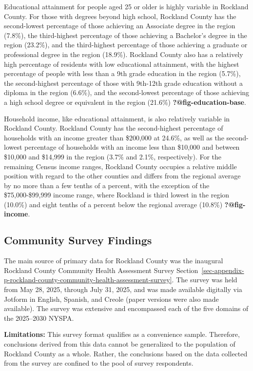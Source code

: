 \documentclass[
  english,
  letterpaper,
]{report}
\begin{document}
Educational attainment for people aged 25 or older is highly variable in
Rockland County. For those with degrees beyond high school, Rockland
County has the second-lowest percentage of those achieving an Associate
degree in the region (7.8\%), the third-highest percentage of those
achieving a Bachelor's degree in the region (23.2\%), and the
third-highest percentage of those achieving a graduate or professional
degree in the region (18.9\%). Rockland County also has a relatively
high percentage of residents with low educational attainment, with the
highest percentage of people with less than a 9th grade education in the
region (5.7\%), the second-highest percentage of those with 9th-12th
grade education without a diploma in the region (6.6\%), and the
second-lowest percentage of those achieving a high school degree or
equivalent in the region (21.6\%) \textbf{?@fig-education-base}.

Household income, like educational attainment, is also relatively
variable in Rockland County. Rockland County has the second-highest
percentage of households with an income greater than \$200,000 at
24.6\%, as well as the second-lowest percentage of households with an
income less than \$10,000 and between \$10,000 and \$14,999 in the
region (3.7\% and 2.1\%, respectively). For the remaining Census income
ranges, Rockland County occupies a relative middle position with regard
to the other counties and differs from the regional average by no more
than a few tenths of a percent, with the exception of the
\$75,000-\$99,999 income range, where Rockland is third lowest in the
region (10.0\%) and eight tenths of a percent below the regional average
(10.8\%) \textbf{?@fig-income}.

\subsection{Community Survey
Findings}\label{community-survey-findings-3}

The main source of primary data for Rockland County was the inaugural
Rockland County Community Health Assessment Survey
Section~\ref{sec-appendix-p-rockland-county-community-health-assessment-survey}.
The survey was held from May 28, 2025, through July 31, 2025, and was
made available digitally via Jotform in English, Spanish, and Creole
(paper versions were also made available). The survey was extensive and
encompassed each of the five domains of the 2025--2030 NYSPA.

\textbf{Limitations:} This survey format qualifies as a convenience
sample. Therefore, conclusions derived from this data cannot be
generalized to the population of Rockland County as a whole. Rather, the
conclusions based on the data collected from the survey are confined to
the pool of survey respondents.
\end{document}
